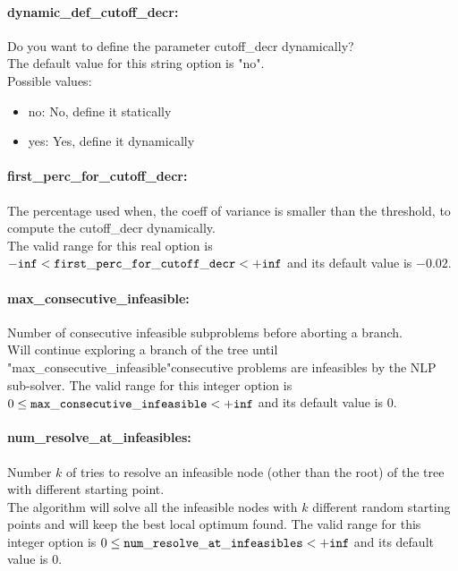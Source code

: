 \paragraph{dynamic\_def\_cutoff\_decr:}\label{sec:dynamic_def_cutoff_decr} Do you want to define the parameter cutoff\_decr dynamically? $\;$ \\

The default value for this string option is "no".
\\ 
Possible values:
\begin{itemize}
   \item no: No, define it statically
   \item yes: Yes, define it dynamically
\end{itemize}

\paragraph{first\_perc\_for\_cutoff\_decr:}\label{sec:first_perc_for_cutoff_decr} The percentage used when, the coeff of variance is smaller than the threshold, to compute the cutoff\_decr dynamically. $\;$ \\
 The valid range for this real option is 
${\tt -inf} <  {\tt first\_perc\_for\_cutoff\_decr } <  {\tt +inf}$
and its default value is $-0.02$.


\paragraph{max\_consecutive\_infeasible:}\label{sec:max_consecutive_infeasible} Number of consecutive infeasible subproblems before aborting a branch. $\;$ \\
 Will continue exploring a branch of the tree
until "max\_consecutive\_infeasible"consecutive
problems are infeasibles by the NLP sub-solver. The valid range for this integer option is
$0 \le {\tt max\_consecutive\_infeasible } <  {\tt +inf}$
and its default value is $0$.


\paragraph{num\_resolve\_at\_infeasibles:}\label{sec:num_resolve_at_infeasibles} Number $k$ of tries to resolve an infeasible node (other than the root) of the tree with different starting point. $\;$ \\
 The algorithm will solve all the infeasible nodes
with $k$ different random starting points and
will keep the best local optimum found. The valid range for this integer option is
$0 \le {\tt num\_resolve\_at\_infeasibles } <  {\tt +inf}$
and its default value is $0$.


